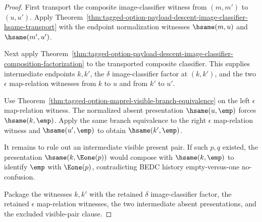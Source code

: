 \begin{proof}
First transport the composite image-classifier witness from $(m,m')$ to
$(u,u')$. Apply
Theorem~\ref{thm:tagged-option-payload-descent-image-classifier-hsame-transport}
with the endpoint normalization witnesses $\hsame(m,u)$ and $\hsame(m',u')$.

Next apply
Theorem~\ref{thm:tagged-option-payload-descent-image-classifier-composition-factorization}
to the transported composite classifier. This supplies intermediate endpoints
$k,k'$, the $\delta$ image-classifier factor at $(k,k')$, and the two
$\epsilon$ map-relation witnesses from $k$ to $u$ and from $k'$ to $u'$.

Use Theorem~\ref{thm:tagged-option-maprel-visible-branch-equivalence} on the
left $\epsilon$ map-relation witness. The normalized absent presentation
$\hsame(u,\emp)$ forces $\hsame(k,\emp)$. Apply the same branch equivalence to
the right $\epsilon$ map-relation witness and $\hsame(u',\emp)$ to obtain
$\hsame(k',\emp)$.

It remains to rule out an intermediate visible present pair. If such $p,q$
existed, the presentation $\hsame(k,\Eone(p))$ would compose with
$\hsame(k,\emp)$ to identify $\emp$ with $\Eone(p)$, contradicting BEDC history
empty-versus-one no-confusion.

Package the witnesses $k,k'$ with the retained $\delta$ image-classifier
factor, the retained $\epsilon$ map-relation witnesses, the two intermediate
absent presentations, and the excluded visible-pair clause.
\end{proof}
